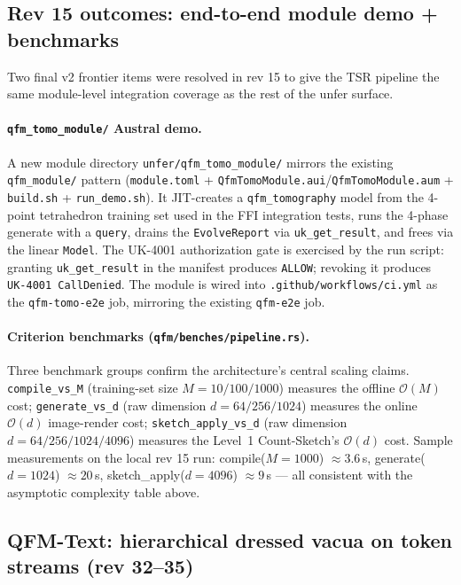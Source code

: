 \documentclass[11pt, a4paper]{article}
\begin{document}
\subsection{Rev 15 outcomes: end-to-end module demo + benchmarks}

Two final v2 frontier items were resolved in rev 15 to give the TSR
pipeline the same module-level integration coverage as the rest of the
unfer surface.

\paragraph{\texttt{qfm\_tomo\_module/} Austral demo.} A new module
directory \texttt{unfer/qfm\_tomo\_module/} mirrors the existing
\texttt{qfm\_module/} pattern (\texttt{module.toml} +
\texttt{QfmTomoModule.aui}/\texttt{QfmTomoModule.aum} +
\texttt{build.sh} + \texttt{run\_demo.sh}). It JIT-creates a
\texttt{qfm\_tomography} model from the 4-point tetrahedron training set
used in the FFI integration tests, runs the 4-phase generate with a
\texttt{query}, drains the \texttt{EvolveReport} via
\texttt{uk\_get\_result}, and frees via the linear \texttt{Model}. The
UK-4001 authorization gate is exercised by the run script: granting
\texttt{uk\_get\_result} in the manifest produces \texttt{ALLOW};
revoking it produces \texttt{UK-4001 CallDenied}. The module is wired
into \texttt{.github/workflows/ci.yml} as the \texttt{qfm-tomo-e2e}
job, mirroring the existing \texttt{qfm-e2e} job.

\paragraph{Criterion benchmarks (\texttt{qfm/benches/pipeline.rs}).}
Three benchmark groups confirm the architecture's central scaling
claims. \texttt{compile\_vs\_M} (training-set size $M=10/100/1000$)
measures the offline $\mathcal{O}(M)$ cost; \texttt{generate\_vs\_d}
(raw dimension $d=64/256/1024$) measures the online $\mathcal{O}(d)$
image-render cost; \texttt{sketch\_apply\_vs\_d} (raw dimension
$d=64/256/1024/4096$) measures the Level~1 Count-Sketch's $\mathcal{O}(d)$
cost. Sample measurements on the local rev 15 run: compile($M=1000$)
$\approx 3.6$\,s, generate($d=1024$) $\approx 20$\,\textmu s,
sketch\_apply($d=4096$) $\approx 9$\,\textmu s --- all consistent with
the asymptotic complexity table above.

\subsection{QFM-Text: hierarchical dressed vacua on token streams
(rev 32--35)}
\end{document}
